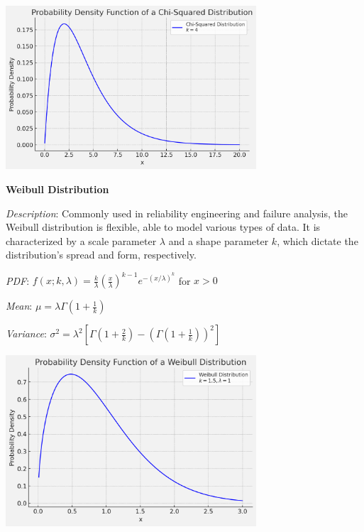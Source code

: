 \documentclass{article}
\begin{document}
\begin{multicols}{2}
\begin{mdframed}
      \begin{center}
        \includegraphics*[width=0.7\textwidth]{chisquared.png}
      \end{center}
\end{mdframed}
\begin{mdframed}
\textbf{Weibull Distribution}
        
\textit{Description}: Commonly used in reliability engineering and failure analysis, the Weibull distribution is flexible, able to model various types of data. It is characterized by a scale parameter $\lambda$ and a shape parameter $k$, which dictate the distribution's spread and form, respectively.
        
\textit{PDF}: $f(x; k, \lambda) = \frac{k}{\lambda}\left(\frac{x}{\lambda}\right)^{k-1}e^{-(x/\lambda)^k}$ for $x > 0$
        
  \textit{Mean}: $\mu = \lambda \Gamma\left(1 + \frac{1}{k}\right)$
        
  \textit{Variance}: $\sigma^2 = \lambda^2 \left[\Gamma\left(1 + \frac{2}{k}\right) - \left(\Gamma\left(1 + \frac{1}{k}\right)\right)^2\right]$
        
  \begin{center}
    \includegraphics*[width=0.7\textwidth]{weibull.png}
  \end{center}
\end{mdframed}

              
\end{multicols}
\end{document}
